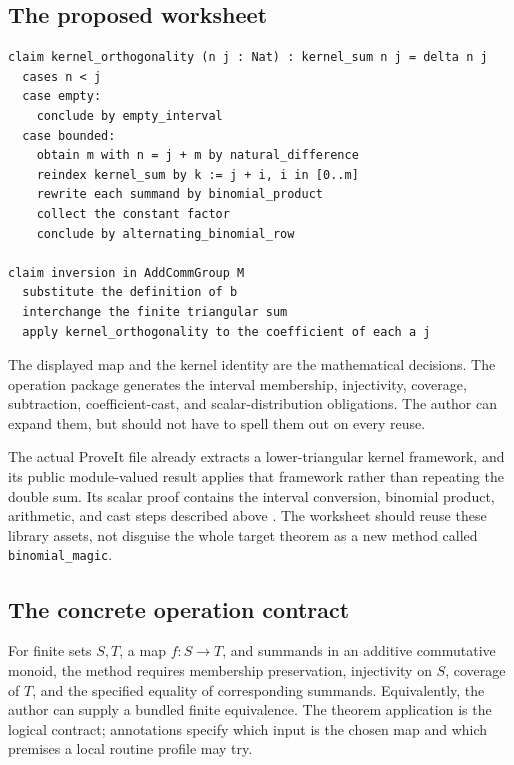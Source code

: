 \documentclass[11pt,a4paper]{article}
\newcommand{\code}[1]{\nolinkurl{#1}}
\theoremstyle{definition}
\begin{document}
\subsection{The proposed worksheet}
\par\noindent\begin{minipage}{\linewidth}
\begin{lstlisting}
claim kernel_orthogonality (n j : Nat) : kernel_sum n j = delta n j
  cases n < j
  case empty:
    conclude by empty_interval
  case bounded:
    obtain m with n = j + m by natural_difference
    reindex kernel_sum by k := j + i, i in [0..m]
    rewrite each summand by binomial_product
    collect the constant factor
    conclude by alternating_binomial_row

claim inversion in AddCommGroup M
  substitute the definition of b
  interchange the finite triangular sum
  apply kernel_orthogonality to the coefficient of each a j
\end{lstlisting}
\end{minipage}\par
The displayed map and the kernel identity are the mathematical decisions.
The operation package generates the interval membership, injectivity, coverage,
subtraction, coefficient-cast, and scalar-distribution obligations. The author
can expand them, but should not have to spell them out on every reuse.

The actual ProveIt file already extracts a lower-triangular kernel framework,
and its public module-valued result applies that framework rather than repeating
the double sum. Its scalar proof contains the interval conversion, binomial
product, arithmetic, and cast steps described above \cite{p-binomial}. The
worksheet should reuse these library assets, not disguise the whole target
theorem as a new method called \code{binomial_magic}.

\subsection{The concrete operation contract}
For finite sets $S,T$, a map $f:S\to T$, and summands in an additive commutative
monoid, the method requires membership preservation, injectivity on $S$, coverage
of $T$, and the specified equality of corresponding summands. Equivalently, the
author can supply a bundled finite equivalence. The theorem application is the
logical contract; annotations specify which input is the chosen map and which
premises a local routine profile may try.
\end{document}
